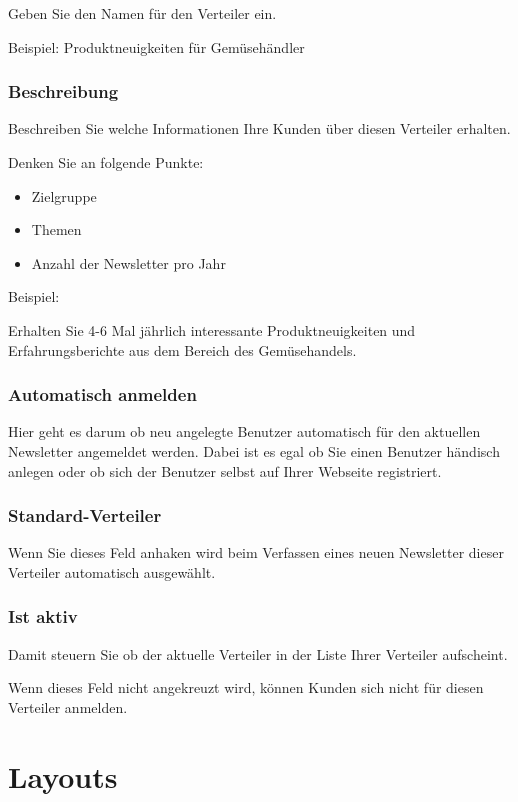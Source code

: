 \documentclass[article, a4paper, oneside, 11pt]{memoir}
\begin{document}
Geben Sie den Namen für den Verteiler ein.

Beispiel: Produktneuigkeiten für Gemüsehändler

\subsection{Beschreibung}

Beschreiben Sie welche Informationen Ihre Kunden über diesen Verteiler erhalten.

Denken Sie an folgende Punkte:
\begin{itemize}
 \item Zielgruppe
 \item Themen
 \item Anzahl der Newsletter pro Jahr
\end{itemize}

Beispiel:  

Erhalten Sie 4-6 Mal jährlich interessante Produktneuigkeiten und Erfahrungsberichte aus dem Bereich des Gemüsehandels.

\subsection{Automatisch anmelden}

Hier geht es darum ob neu angelegte Benutzer automatisch für den aktuellen Newsletter angemeldet werden.
Dabei ist es egal ob Sie einen Benutzer händisch anlegen oder ob sich der Benutzer selbst auf Ihrer Webseite registriert.

\subsection{Standard-Verteiler}

Wenn Sie dieses Feld anhaken wird beim Verfassen eines neuen Newsletter dieser Verteiler automatisch ausgewählt.

\subsection{Ist aktiv}

Damit steuern Sie ob der aktuelle Verteiler in der Liste Ihrer Verteiler aufscheint.

Wenn dieses Feld nicht angekreuzt wird, können Kunden sich nicht für diesen Verteiler anmelden.


\chapter{Layouts}
\end{document}
